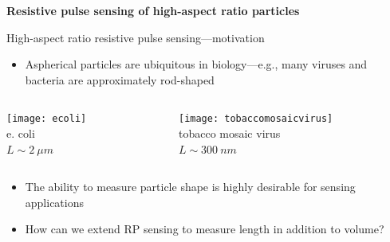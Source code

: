 \begin{frame}[c]{}
	\begin{center}
		\textbf{Resistive pulse sensing of high-aspect ratio particles}
	\end{center}
\end{frame}






\begin{frame}[c]{High-aspect ratio resistive pulse sensing---motivation}
 	\begin{itemize}
 		\item Aspherical particles are ubiquitous in biology---e.g., many viruses and bacteria are approximately rod-shaped
 	\end{itemize}


	\begin{columns}[t]
		\begin{column}[T]{2.5in}
			{\centering
				\texttt{[image: ecoli]} \\
				e. coli \\
				$L\sim \SI{2}{\mu m}$ \\
				\par
			}
		\end{column}
		
		
		\begin{column}[T]{2.5in}
			{\centering
				\texttt{[image: tobaccomosaicvirus]} \\
				tobacco mosaic virus \\
				$L\sim \SI{300}{nm}$ \\
				\par
			}
		\end{column}
	

	\end{columns}

	\begin{itemize}
		\item The ability to measure particle shape is highly desirable for sensing applications
 		\item How can we extend RP sensing to measure length in addition to volume?
 	\end{itemize}
	

\end{frame}




